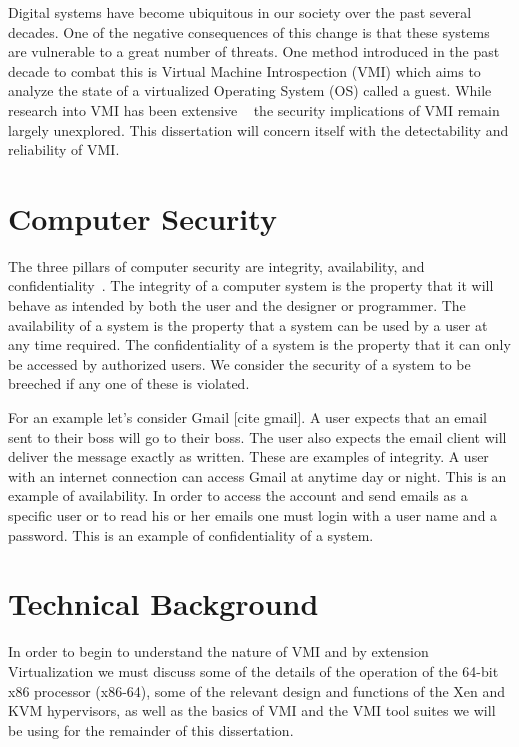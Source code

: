 
Digital systems have become ubiquitous in our society over the past several decades. One of the negative consequences of this change is that these systems are vulnerable to a great number of threats. One method introduced in the past decade to combat this is Virtual Machine Introspection (VMI) which aims to analyze the state of a virtualized Operating System (OS) called a guest. While research into VMI has been extensive ~\cite{bahram_dksm:_2010,pfoh_exploiting_2010,dolan-gavitt_leveraging_2011,dolan-gavitt_virtuoso:_2011,gu_process_2011-1,fu_bridging_2013,garfinkel_virtual_2003,hay_forensics_2008} the security implications of VMI remain largely unexplored. This dissertation will concern itself with the detectability and reliability of VMI.

\section{Computer Security}

The three pillars of computer security are integrity, availability, and confidentiality~\cite{bishop_computer_2012}.  The integrity of a computer system is the property that it will behave as intended by both the user and the designer or programmer.  The availability of a system is the property that a system can be used by a user at any time required. The confidentiality of a system is the property that it can only be accessed by authorized users.  We consider the security of a system to be breeched if any one of these is violated. 

For an example let's consider Gmail [cite gmail].  A user expects that an email sent to their boss will go to their boss. The user also expects the email client will deliver the message exactly as written. These are examples of integrity. A user with an internet connection can access Gmail at anytime day or night. This is an example of availability. In order to access the account and send emails as a specific user or to read his or her emails one must login with a user name and a password.  This is an example of confidentiality of a system. 

\section{Technical Background}
In order to begin to understand the nature of VMI and by extension Virtualization we must discuss some of the details of the operation of the 64-bit x86 processor (x86-64), some of the relevant design and functions of the Xen and KVM hypervisors, as well as the basics of VMI and the VMI tool suites we will be using for the remainder of this dissertation. 




